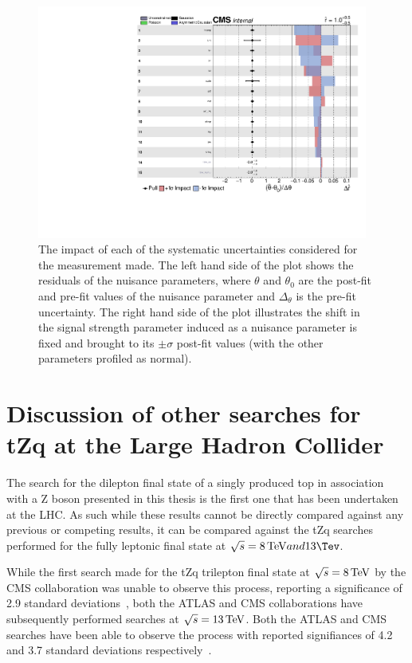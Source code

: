 \begin{figure}[htbp]
\begin{center}
\includegraphics[width=0.97\textwidth]{figs/results/systematicsImpact.pdf}
\caption{The impact of each of the systematic uncertainties considered for the measurement made. The left hand side of the plot shows the residuals of the nuisance parameters, where $\theta$ and $\theta_{0}$ are the post-fit and pre-fit values of the nuisance parameter and $\Delta_{\theta}$ is the pre-fit uncertainty. The right hand side of the plot illustrates the shift in the signal strength parameter induced as a nuisance parameter is fixed and brought to its $\pm \sigma$ post-fit values (with the other parameters profiled as normal).}
\label{fig:systematicsPull}
\end{center}
\end{figure}


\section{Discussion of other searches for tZq at the Large Hadron Collider}
The search for the dilepton final state of a singly produced top in association with a Z boson presented in this thesis is the first one that has been undertaken at the LHC.
As such while these results cannot be directly compared against any previous or competing results, it can be compared against the tZq searches performed for the fully leptonic	final state at $\sqrt{s} = 8 \TeV and 13 \Tev$.

While the first search made for the tZq trilepton final state at $\sqrt{s} = 8 \,\text{Te\hspace{-.08em}V}$ by the CMS collaboration was unable to observe this process, reporting a significance of 2.9 standard deviations~\cite{Sirunyan:2017kkr}, both the ATLAS and CMS collaborations have subsequently performed searches at $\sqrt{s} = 13 \,\text{Te\hspace{-.08em}V}$.
Both the ATLAS and CMS searches have been able to observe the process with reported signifiances of 4.2 and 3.7 standard deviations respectively~\cite{Aaboud:2017ylb,Sirunyan:2017nbr}.

